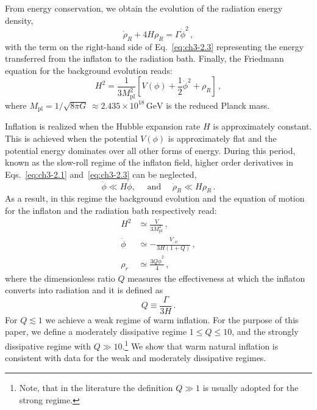 From energy conservation, we obtain the evolution of the radiation energy density,
\begin{equation}
    \Dot{\rho}_R+4H\rho_R=\Gamma \Dot{\phi}^2\,,  \label{eq:ch3-2.3}
\end{equation}
with the term on the right-hand side of Eq.~\ref{eq:ch3-2.3} representing the energy transferred from the inflaton to the radiation bath.
Finally, the Friedmann equation for the background evolution reads:
\begin{equation}
    H^2=\frac{1}{3M_{\mathrm{pl}}^2}\left[V(\phi)+\frac{1}{2}\Dot{\phi}^2+\rho_R\right]\,,  \label{eq:ch3-2.4}
\end{equation}
where $M_{\mathrm{pl}} = 1/\sqrt{8 \pi G} \, \approx 2.435\times 10^{18}\,\mathrm{GeV}$ is the reduced Planck mass.

Inflation is realized when the Hubble expansion rate $H$ is approximately constant. This is achieved when the potential $V(\phi)$ is approximately flat and the potential energy dominates over all other forms of energy. During this period, known as the slow-roll regime of the inflaton field, higher order derivatives in Eqs.~\ref{eq:ch3-2.1} and~\ref{eq:ch3-2.3} can be neglected,
\begin{equation}
    \ddot{\phi} \ll H \dot{\phi}, \quad \text { and } \quad \dot{\rho}_{R} \ll H \rho_{R}\,. \label{eq:ch3-2.5}
\end{equation}
As a result, in this regime the background evolution and the equation of motion for the inflaton and the radiation bath respectively read:
\begin{align}
    H^2&\simeq \frac{V}{3M_{\mathrm{pl}}^2}\,, \label{eq:ch3-SR1} \\
    \Dot{\phi}&\simeq -\frac{V_{,\phi}}{3H(1+Q)}\,, \label{eq:ch3-SR2}\\
    \rho_r&\simeq \frac{3Q \Dot{\phi}^2}{4}\,,\label{eq:ch3-SR3}
\end{align}
where the dimensionless ratio $Q$ measures the effectiveness at which the inflaton converts into radiation and it is defined as
\begin{equation}
    Q \equiv \frac{\Gamma}{3 H}\,.
\end{equation}
For $Q\lesssim 1$ we achieve a weak regime of warm inflation. For the purpose of this paper, we define a moderately dissipative regime $1\leq Q\leq 10$, and the strongly dissipative regime with $Q \gg 10$.\footnote{Note, that in the literature the definition $Q \gg 1$ is usually adopted for the strong regime.} We show that warm natural inflation is consistent with data for the weak and moderately dissipative regimes.

